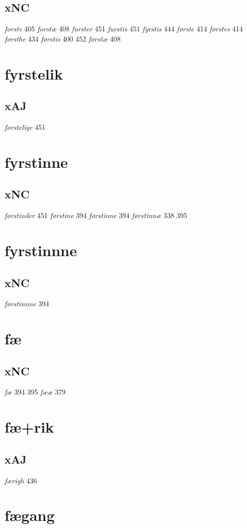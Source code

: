 \documentclass[a4paper,twocolumn]{article}
\begin{document}
\subsection{xNC}
\label{sec:org3191681}
\emph{forste} 405 \emph{forstæ} 408 \emph{furster} 451 \emph{furstis} 451 \emph{fyrstis} 444 \emph{første} 414 \emph{førstes} 414 \emph{førsthe} 434 \emph{førstis} 400 452 \emph{førstæ} 408 
\section{fyrstelik}
\label{sec:org9f3cdd7}
\subsection{xAJ}
\label{sec:org4208f06}
\emph{førstelige} 451 
\section{fyrstinne}
\label{sec:orgbc5961c}
\subsection{xNC}
\label{sec:orgfef36ce}
\emph{førstinder} 451 \emph{førstine} 394 \emph{førstinne} 394 \emph{førstinnæ} 338 395 
\section{fyrstinnne}
\label{sec:org9eecdfb}
\subsection{xNC}
\label{sec:org82d59a1}
\emph{førstinnne} 394 
\section{fæ}
\label{sec:orgba82b12}
\subsection{xNC}
\label{sec:org379c8f2}
\emph{fæ} 394 395 \emph{fææ} 379 
\section{fæ+rik}
\label{sec:orgafe8b39}
\subsection{xAJ}
\label{sec:org9ed975a}
\emph{færigh} 436 
\section{fægang}
\label{sec:org41a9f05}
\end{document}
